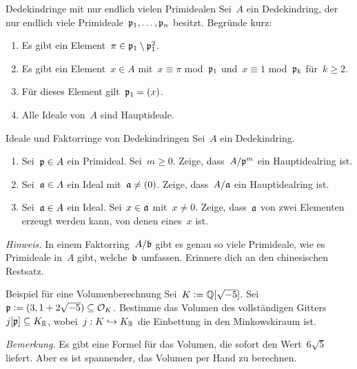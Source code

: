 \documentclass{uebblatt}
\begin{document}

\begin{aufgabe}{Dedekindringe mit nur endlich vielen Primidealen}
Sei~$A$ ein Dedekindring, der nur endlich viele
Primideale~$\mathfrak{p}_1,\ldots,\mathfrak{p}_n$ besitzt. Begründe kurz:
\begin{enumerate}
\item Es gibt ein Element~$\pi \in \mathfrak{p}_1 \setminus \mathfrak{p}_1^2$.
\item Es gibt ein Element~$x \in A$ mit~$x \equiv \pi$
mod~$\mathfrak{p}_1$ und~$x \equiv 1$ mod~$\mathfrak{p}_k$ für~$k \geq 2$.
\item Für dieses Element gilt~$\mathfrak{p}_1 = (x)$.
\item Alle Ideale von~$A$ sind Hauptideale.
\end{enumerate}
\end{aufgabe}

\begin{aufgabe}{Ideale und Faktorringe von Dedekindringen}
Sei~$A$ ein Dedekindring.
\begin{enumerate}
\item Sei~$\mathfrak{p} \in A$ ein Primideal. Sei~$m \geq 0$. Zeige, dass~$A/\mathfrak{p}^m$ ein Hauptidealring
ist.
\item Sei~$\mathfrak{a} \in A$ ein Ideal mit~$\mathfrak{a} \neq (0)$. Zeige, dass~$A/\mathfrak{a}$ ein
Hauptidealring ist.
\item Sei~$\mathfrak{a} \in A$ ein Ideal. Sei~$x \in \mathfrak{a}$ mit~$x \neq 0$. Zeige,
dass~$\mathfrak{a}$ von zwei Elementen erzeugt werden kann, von denen eines~$x$ ist.
\end{enumerate}
{\tiny\emph{Hinweis.} In einem Faktorring~$A/\mathfrak{b}$ gibt es genau so viele
Primideale, wie es Primideale in~$A$ gibt, welche~$\mathfrak{b}$ umfassen. Erinnere
dich an den chinesischen Restsatz.\par}
\end{aufgabe}

\begin{aufgabe}{Beispiel für eine Volumenberechnung}
Sei~$K \vcentcolon= \mathbb{Q}[\sqrt{-5}]$. Sei~$\mathfrak{p} \vcentcolon= (3, 1 + 2\sqrt{-5}) \subseteq
\mathcal{O}_K$. Bestimme das Volumen des vollständigen
Gitters~$j[\mathfrak{p}] \subseteq K_{\mathbb{R}}$, wobei~$j : K \hookrightarrow K_{\mathbb{R}}$ die
Einbettung in den Minkowskiraum ist.

{\tiny\emph{Bemerkung.} Es gibt eine Formel für das Volumen, die sofort den
Wert~$6 \sqrt{5}$ liefert. Aber es ist spannender, das Volumen per Hand zu
berechnen.\par}
\end{aufgabe}
\end{document}
